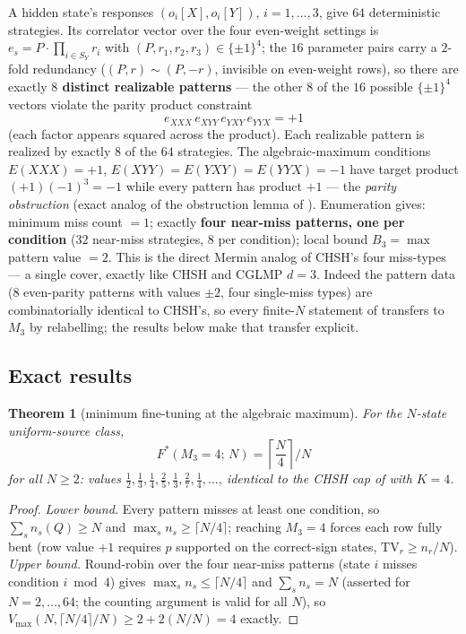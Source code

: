 \documentclass[aps,pra,reprint,superscriptaddress,floatfix]{revtex4-2}
\newcommand{\TV}{\mathrm{TV}}
\newtheorem{theorem}{Theorem}
\begin{document}
A hidden state's responses $(o_{i}[X],o_{i}[Y])$, $i=1,\dots,3$, give $64$
deterministic strategies. Its correlator vector over the four even-weight
settings is $e_{s}=P\cdot\prod_{i\in S_{Y}}r_{i}$ with
$(P,r_{1},r_{2},r_{3})\in\{\pm1\}^{4}$; the $16$ parameter pairs carry a
$2$-fold redundancy ($(P,r)\sim(P,-r)$, invisible on even-weight rows),
so there are exactly \textbf{$8$ distinct realizable patterns} --- the
other $8$ of the $16$ possible $\{\pm1\}^{4}$ vectors violate the parity
product constraint
\begin{equation*}
e_{XXX}\,e_{XYY}\,e_{YXY}\,e_{YYX}=+1
\end{equation*}
(each factor appears squared across the product). Each realizable pattern
is realized by exactly $8$ of the $64$ strategies. The algebraic-maximum
conditions $E(XXX)=+1$, $E(XYY)=E(YXY)=E(YYX)=-1$ have target product
$(+1)(-1)^{3}=-1$ while every pattern has product $+1$ --- the
\emph{parity obstruction} (exact analog of the obstruction lemma of
\cite{mainpaper2026}). Enumeration gives: minimum miss count $=1$; exactly
\textbf{four near-miss patterns, one per condition} ($32$ near-miss
strategies, $8$ per condition); local bound $B_{3}=\max$ pattern value
$=2$. This is the direct {Mermin} analog of {CHSH}'s four miss-types --- a
single cover, exactly like {CHSH} and {CGLMP} $d=3$. Indeed the pattern
data ($8$ even-parity patterns with values $\pm2$, four single-miss types)
are combinatorially identical to {CHSH}'s, so every finite-$N$ statement of
\cite{mainpaper2026} transfers to $M_{3}$ by relabelling; the results below
make that transfer explicit.

\subsection{Exact results}

\begin{theorem}[minimum fine-tuning at the algebraic maximum]
\label{thm:mermin3}
For the $N$-state uniform-source class,
\begin{equation}
F^{*}(M_{3}=4;\,N)=\left\lceil\frac{N}{4}\right\rceil\!\Big/N
\label{eq:fmermin3}
\end{equation}
for all $N\ge 2$: values $\tfrac12,\tfrac13,\tfrac14,\tfrac25,\tfrac13,
\tfrac27,\tfrac14,\dots$, identical to the {CHSH} cap of
\cite{mainpaper2026} with $K=4$.
\end{theorem}

\begin{proof}
\emph{Lower bound.} Every pattern misses at least one condition, so
$\sum_{s}n_{s}(Q)\ge N$ and $\max_{s}n_{s}\ge\lceil N/4\rceil$;
reaching $M_{3}=4$ forces each row fully bent (row value $+1$ requires
$p$ supported on the correct-sign states, $\TV_{r}\ge n_{r}/N$).
\emph{Upper bound.} Round-robin over the four near-miss patterns (state
$i$ misses condition $i\bmod 4$) gives $\max_{s}n_{s}\le\lceil N/4
\rceil$ and $\sum_{s}n_{s}=N$ (asserted for $N=2,\dots,64$; the counting
argument is valid for all $N$), so
$V_{\max}(N,\lceil N/4\rceil/N)\ge 2+2(N/N)=4$ exactly.
\end{proof}
\end{document}

